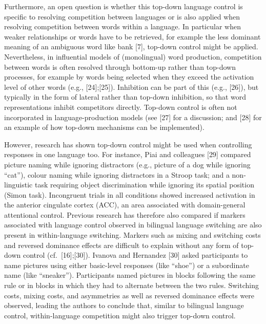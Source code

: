 \documentclass[
]{article}
\begin{document}
Furthermore, an open question is whether this top-down language control is specific to resolving competition between languages or is also applied when resolving competition between words within a language. In particular when weaker relationships or words have to be retrieved, for example the less dominant meaning of an ambiguous word like bank {[}7{]}, top-down control might be applied. Nevertheless, in influential models of (monolingual) word production, competition between words is often resolved through bottom-up rather than top-down processes, for example by words being selected when they exceed the activation level of other words (e.g., {[}24{]};{[}25{]}). Inhibition can be part of this (e.g., {[}26{]}), but typically in the form of lateral rather than top-down inhibition, so that word representations inhibit competitors directly. Top-down control is often not incorporated in language-production models (see {[}27{]} for a discussion; and {[}28{]} for an example of how top-down mechanisms can be implemented).

However, research has shown top-down control might be used when controlling responses in one language too. For instance, Piai and colleagues {[}29{]} compared picture naming while ignoring distractors (e.g., picture of a dog while ignoring ``cat''), colour naming while ignoring distractors in a Stroop task; and a non-linguistic task requiring object discrimination while ignoring its spatial position (Simon task). Incongruent trials in all conditions showed increased activation in the anterior cingulate cortex (ACC), an area associated with domain-general attentional control.
Previous research has therefore also compared if markers associated with language control observed in bilingual language switching are also present in within-language switching. Markers such as mixing and switching costs and reversed dominance effects are difficult to explain without any form of top-down control (cf.~{[}16{]};{[}30{]}). Ivanova and Hernandez {[}30{]} asked participants to name pictures using either basic-level responses (like ``shoe'') or a subordinate name (like ``sneaker''). Participants named pictures in blocks following the same rule or in blocks in which they had to alternate between the two rules. Switching costs, mixing costs, and asymmetries as well as reversed dominance effects were observed, leading the authors to conclude that, similar to bilingual language control, within-language competition might also trigger top-down control.
\end{document}
